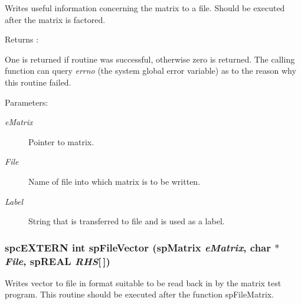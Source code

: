 Writes useful information concerning the matrix to a file. Should be executed after the matrix is factored.

\begin{Desc}
\item[Returns :]\par
 One is returned if routine was successful, otherwise zero is returned. The calling function can query {\em errno} (the system global error variable) as to the reason why this routine failed.\end{Desc}
\begin{Desc}
\item[Parameters: ]\par
\begin{description}
\item[{\em 
e\-Matrix}]Pointer to matrix. \item[{\em 
File}]Name of file into which matrix is to be written. \item[{\em 
Label}]String that is transferred to file and is used as a label. \end{description}
\end{Desc}
\subsubsection{\setlength{\rightskip}{0pt plus 5cm}spc\-EXTERN int sp\-File\-Vector ({\bf sp\-Matrix} {\em e\-Matrix}, char $\ast$ {\em File}, sp\-REAL {\em RHS}[$\,$])}\label{spMatrix_8h_a57}


Writes vector to file in format suitable to be read back in by the matrix test program. This routine should be executed after the function sp\-File\-Matrix.

